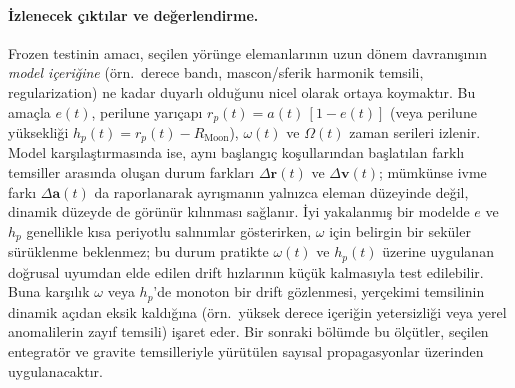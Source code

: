 \paragraph{İzlenecek çıktılar ve değerlendirme.}
Frozen testinin amacı, seçilen yörünge elemanlarının uzun dönem davranışının \emph{model içeriğine} (örn.\ derece bandı,
mascon/sferik harmonik temsili, regularization) ne kadar duyarlı olduğunu nicel olarak ortaya koymaktır. Bu amaçla
$e(t)$, perilune yarıçapı $r_p(t)=a(t)\,[1-e(t)]$ (veya perilune yüksekliği $h_p(t)=r_p(t)-R_{\text{Moon}}$),
$\omega(t)$ ve $\Omega(t)$ zaman serileri izlenir. Model karşılaştırmasında ise, aynı başlangıç koşullarından
başlatılan farklı temsiller arasında oluşan durum farkları $\Delta \mathbf r(t)$ ve $\Delta \mathbf v(t)$; mümkünse
ivme farkı $\Delta \mathbf a(t)$ da raporlanarak ayrışmanın yalnızca eleman düzeyinde değil, dinamik düzeyde de
görünür kılınması sağlanır. İyi yakalanmış bir modelde $e$ ve $h_p$ genellikle kısa periyotlu salınımlar gösterirken,
$\omega$ için belirgin bir seküler sürüklenme beklenmez; bu durum pratikte $\omega(t)$ ve $h_p(t)$ üzerine uygulanan
doğrusal uyumdan elde edilen drift hızlarının küçük kalmasıyla test edilebilir. Buna karşılık $\omega$ veya $h_p$’de
monoton bir drift gözlenmesi, yerçekimi temsilinin dinamik açıdan eksik kaldığına (örn.\ yüksek derece içeriğin yetersizliği
veya yerel anomalilerin zayıf temsili) işaret eder. Bir sonraki bölümde bu ölçütler, seçilen entegratör ve gravite temsilleriyle
yürütülen sayısal propagasyonlar üzerinden uygulanacaktır.



